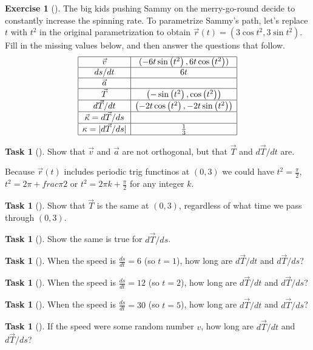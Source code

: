 \documentclass[10pt,]{book}
\theoremstyle{plain}
\theoremstyle{definition}
\theoremstyle{definition}
\theoremstyle{definition}
\theoremstyle{definition}
\newtheorem{exploration}[project]{Exercise}
\newtheorem{task}[project]{Task}
\theoremstyle{definition}
\numberwithin{equation}{section}
\newcommand{\amp}{&}
\begin{document}
\begin{exploration}[]\label{exploration-173}
The big kids pushing Sammy on the merry-go-round decide to constantly increase the spinning rate. To parametrize Sammy's path, let's replace \(t\) with \(t^2\) in the original parametrization to obtain \(\vec r(t) = (3\cos t^2, 3\sin t^2)\). Fill in the missing values below, and then answer the questions that follow.%
\begin{equation*}
\begin{array}{|c|c|}\hline
\vec v \amp  ( -6 t \sin \left(t^2\right),6 t \cos \left(t^2\right) ) \\\hline
ds/dt \amp  6 t \\\hline
\vec a \amp  
\\\hline
\vec T \amp  \left(-\sin \left(t^2\right),\cos \left(t^2\right)\right) 
\\\hline
d\vec T/dt \amp  \left(-2 t \cos \left(t^2\right),-2 t \sin \left(t^2\right)\right)\\\hline
\vec \kappa = d\vec T/ds \amp  
\\\hline
\kappa =|d\vec T/ds| \amp  \frac{1}{3} \\\hline
\end{array}
\end{equation*}
%
\begin{task}[]\label{task-417}
Show that \(\vec v\) and \(\vec a\) are not orthogonal, but that \(\vec T\) and \(d\vec T/dt\) are.%
\end{task}
Because \(\vec r (t)\) includes periodic trig functinos at \((0,3)\) we could have \(t^2 = \frac{\pi}{2}\), \(t^2=2\pi+frac{\pi}{2}\) or \(t^2=2\pi k + \frac{\pi}{2}\) for any integer \(k\).%
\begin{task}[]\label{task-418}
Show that \(\vec T\) is the same at \((0,3)\), regardless of what time we pass through \((0,3)\).%
\end{task}
\begin{task}[]\label{task-419}
Show the same is true for \(d\vec T/ds\).%
\end{task}
\begin{task}[]\label{task-420}
When the speed is \(\frac{ds}{dt}=6\) (so \(t=1\)), how long are \(d\vec T/dt\) and \(d\vec T/ds\)?%
\begin{task}[]\label{task-421}
When the speed is \(\frac{ds}{dt}=12\) (so \(t=2\)), how long are \(d\vec T/dt\) and \(d\vec T/ds\)?%
\end{task}
\begin{task}[]\label{task-422}
When the speed is \(\frac{ds}{dt}=30\) (so \(t=5\)), how long are \(d\vec T/dt\) and \(d\vec T/ds\)?%
\end{task}
\begin{task}[]\label{task-423}
If the speed were some random number \(v\), how long are \(d\vec T/dt\) and \(d\vec T/ds\)?%
\end{task}
\end{task}
\end{exploration}
\end{document}
